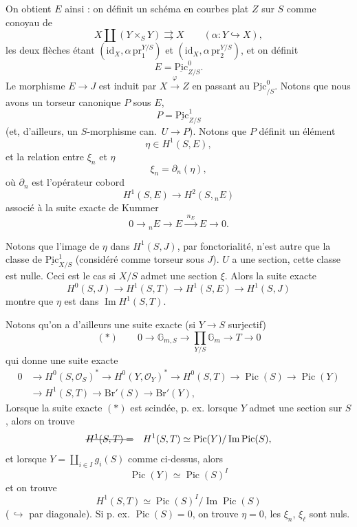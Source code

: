 \documentclass[11pt,a4paper]{article}
\begin{document}
On obtient $E$ ainsi : \struck{\ill{}} on définit un schéma en courbes plat $Z$ sur $S$ comme conoyau de
\[
  X \amalg (Y \times_S Y) \rightrightarrows X
  \qquad (\alpha : Y \hookrightarrow X),
\]
les deux flèches étant $(\mathrm{id}_X, \alpha\, \mathrm{pr}_1^{Y/S})$ et $(\mathrm{id}_X, \alpha\, \mathrm{pr}_2^{Y/S})$, et on définit
\[
  E = \underline{\mathrm{Pic}}^0_{Z/S}.
\]
\struck{\ill{}} Le morphisme $E \to J$ est induit par $X \xrightarrow{\varphi} Z$ en passant au $\underline{\mathrm{Pic}}^0_{/S}$. Notons que nous avons un torseur canonique $P$ sous $E$,
\[
  P = \underline{\mathrm{Pic}}^1_{Z/S}
\]
(et, d'ailleurs, un $S$-morphisme can.\ $U \to P$). Notons que $P$ définit un élément
\[
  \boxed{\eta \in H^1(S, E)},
\]
et la relation entre $\xi_n$ et $\eta$ 
\[
  \boxed{\xi_n = \partial_n(\eta)},
\]
où $\partial_n$ est l'opérateur cobord
\[
  H^1(S, E) \longrightarrow H^2(S, {}_n E)
\]
associé à la suite exacte de Kummer
\[
  0 \to {}_n E \to E \xrightarrow{\;n_E\;} E \to 0 .
\]

Notons que l'image de $\eta$ dans $H^1(S, J)$, par fonctorialité, n'est autre que la classe de $\underline{\mathrm{Pic}}^1_{X/S}$ (considéré comme torseur sous $J$).  $U$ a une section, cette classe est nulle. Ceci est le cas si $X/S$ admet une section $\xi$.  Alors la suite exacte
\[
  H^0(S, J) \to H^1(S, T) \to H^1(S, E) \to H^1(S, J)
\]
montre que $\eta$ est dans $\operatorname{Im} H^1(S, T)$.

Notons qu'on a d'ailleurs une suite exacte (si $Y \to S$ surjectif)
\[
  (*) \qquad 0 \to \mathbb{G}_{m,S} \to \prod_{Y/S} \mathbb{G}_m \to T \to 0
\]
qui donne une suite exacte \struck{\ill{}}
\[
  \begin{aligned}
  0 &\to H^0(S, \mathcal{O}_S)^* \to H^0(Y, \mathcal{O}_Y)^* \to H^0(S, T) \to \operatorname{Pic}(S) \to \operatorname{Pic}(Y) \\
    &\to H^1(S, T) \to \mathrm{Br}'(S) \to \mathrm{Br}'(Y),
  \end{aligned}
\]
Lorsque la suite exacte $(*)$ est scindée, p. ex. lorsque $Y$ admet une section sur $S$, alors on trouve
\[
  \text{\struck{$H^1(S,T) =$}} \quad H^1(S, T) \simeq \operatorname{Pic}(Y) / \operatorname{Im} \operatorname{Pic}(S),
\]
et lorsque $Y = \coprod_{i \in I} g_i(S)$ comme ci-dessus, alors \struck{\ill{}}
\[
  \operatorname{Pic}(Y) \simeq \operatorname{Pic}(S)^I
\]
et on trouve
\[
  H^1(S, T) \simeq \operatorname{Pic}(S)^I / \operatorname{Im} \operatorname{Pic}(S)
\]
(\,$\hookrightarrow$ par diagonale). Si p. ex. $\operatorname{Pic}(S) = 0$, on trouve $\eta = 0$,  les $\xi_n$, $\xi_\ell$ sont nuls.
\end{document}
